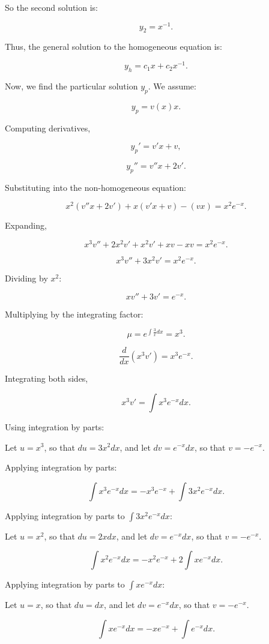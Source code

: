 \documentclass[12pt]{article}
\begin{document}
\begin{enumerate}
\begin{enumerate}
So the second solution is:

\[
y_2 = x^{-1}.
\]

Thus, the general solution to the homogeneous equation is:

\[
y_h = c_1 x + c_2 x^{-1}.
\]

Now, we find the particular solution \( y_p \).  
We assume:

\[
y_p = v(x) x.
\]

Computing derivatives,

\[
y_p' = v' x + v,
\]

\[
y_p'' = v'' x + 2 v'.
\]

Substituting into the non-homogeneous equation:

\[
x^2 (v'' x + 2 v') + x (v' x + v) - (v x) = x^2 e^{-x}.
\]

Expanding,

\[
x^3 v'' + 2x^2 v' + x^2 v' + x v - x v = x^2 e^{-x}.
\]

\[
x^3 v'' + 3x^2 v' = x^2 e^{-x}.
\]

Dividing by \( x^2 \):

\[
x v'' + 3 v' = e^{-x}.
\]

Multiplying by the integrating factor:

\[
\mu = e^{\int \frac{3}{x} dx} = x^3.
\]

\[
\frac{d}{dx} (x^3 v') = x^3 e^{-x}.
\]

Integrating both sides,

\[
x^3 v' = \int x^3 e^{-x} dx.
\]

Using integration by parts:

Let \( u = x^3 \), so that \( du = 3x^2 dx \),  
and let \( dv = e^{-x} dx \), so that \( v = -e^{-x} \).  

Applying integration by parts:

\[
\int x^3 e^{-x} dx = -x^3 e^{-x} + \int 3x^2 e^{-x} dx.
\]

Applying integration by parts to \( \int 3x^2 e^{-x} dx \):

Let \( u = x^2 \), so that \( du = 2x dx \),  
and let \( dv = e^{-x} dx \), so that \( v = -e^{-x} \).  

\[
\int x^2 e^{-x} dx = -x^2 e^{-x} + 2 \int x e^{-x} dx.
\]

Applying integration by parts to \( \int x e^{-x} dx \):

Let \( u = x \), so that \( du = dx \),  
and let \( dv = e^{-x} dx \), so that \( v = -e^{-x} \).  

\[
\int x e^{-x} dx = -x e^{-x} + \int e^{-x} dx.
\]


\end{enumerate}
\end{enumerate}
\end{document}
